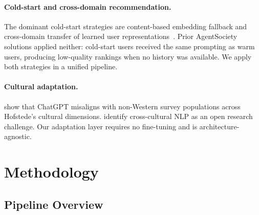 \documentclass[11pt]{article}
\begin{document}
\paragraph{Cold-start and cross-domain recommendation.}
The dominant cold-start strategies are content-based embedding fallback and
cross-domain transfer of learned user representations~\citep{yuanchenbei2024coldstart}.
Prior AgentSociety solutions applied neither: cold-start users received the
same prompting as warm users, producing low-quality rankings when no history
was available.
We apply both strategies in a unified pipeline.

\paragraph{Cultural adaptation.}
\citet{cao2023assessing} show that ChatGPT misaligns with non-Western survey
populations across Hofstede's cultural dimensions.
\citet{hershcovich2022challenges} identify cross-cultural NLP as an open
research challenge.
Our adaptation layer requires no fine-tuning and is architecture-agnostic.

\section{Methodology}

\subsection{Pipeline Overview}
\end{document}
